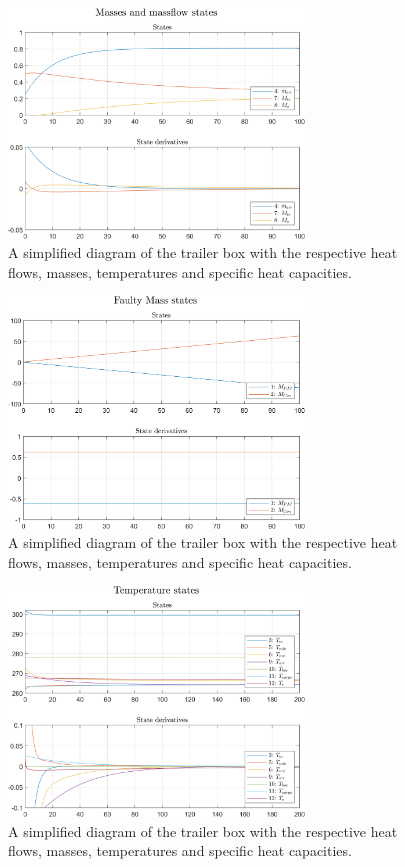 \begin{figure}[h]
	\centering
	\includegraphics[width=0.7\textwidth]{Graphics/nonlin_sim_Mass.png}
	\caption{A simplified diagram of the trailer box with the respective heat flows, masses, temperatures and specific heat capacities.}
	\label{fig:non_lin_sim_Mass}
\end{figure}
\clearpage
\begin{figure}[h]
	\centering
	\includegraphics[width=0.7\textwidth]{Graphics/nonlin_sim_faulty_Mass.png}
	\caption{A simplified diagram of the trailer box with the respective heat flows, masses, temperatures and specific heat capacities.}
	\label{fig:non_lin_sim_faulty_Mass}
\end{figure}
\clearpage
\begin{figure}[h]
	\centering
	\includegraphics[width=0.7\textwidth]{Graphics/nonlin_sim_Temperature.png}
	\caption{A simplified diagram of the trailer box with the respective heat flows, masses, temperatures and specific heat capacities.}
	\label{fig:non_lin_sim_Temperature}
\end{figure}


